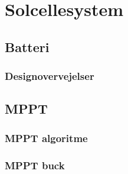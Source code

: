 \documentclass[../main.tex]{subfiles}
\begin{document}
\chapter{Solcellesystem} \label{Chap:Solcellesystem}

\section{Batteri}

\subsection{Designovervejelser}

\section{MPPT}



\subsection{MPPT algoritme}

\subsection{MPPT buck}

\subsection{}

\subsection{}
\end{document}
